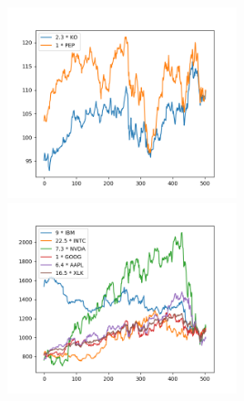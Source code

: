 \documentclass[12pt]{article}
\begin{document}
\includegraphics[width=0.5\textwidth]{Teil1_hist_2y}	
\includegraphics[width=0.5\textwidth]{Teil2_hist_2y}	
\end{document}
